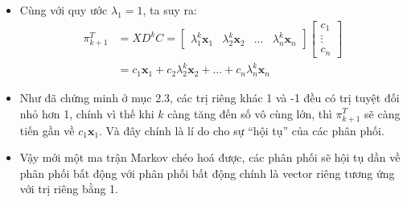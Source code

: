 \begin{proofvn}
\begin{itemize}
        \item Cùng với quy ước $\lambda_1 = 1$, ta suy ra:
        \begin{align}
            \pi_{k+1}^T &= X D^k C = \begin{bmatrix}
            \lambda_1^k\textbf{x}_1& \lambda_2^k\textbf{x}_2 & \dots&\lambda_n^k\textbf{x}_n
            \end{bmatrix} \begin{bmatrix}
                c_1 \\
                \vdots \\
                c_n
            \end{bmatrix}\\
            &= c_1\textbf{x}_1 + c_2 \lambda_2^k \textbf{x}_2 + ... + c_n \lambda_n^k \textbf{x}_n
        \end{align}

        \item Như đã chứng minh ở mục 2.3, các trị riêng khác 1 và -1 đều có trị tuyệt đối nhỏ hơn 1, chính vì thế khi $k$ càng tăng đến số vô cùng lớn, thì $\pi_{k+1}^T$ sẽ càng tiến gần về $c_1\textbf{x}_1$. Và đây chính là lí do cho sự ``hội tụ'' của các phân phối.

        \item Vậy mới một ma trận Markov chéo hoá được, các phân phối sẽ hội tụ dần về phân phối bất động với phân phối bất động chính là vector riêng tương ứng với trị riêng bằng 1.
    \end{itemize}
\end{proofvn}

